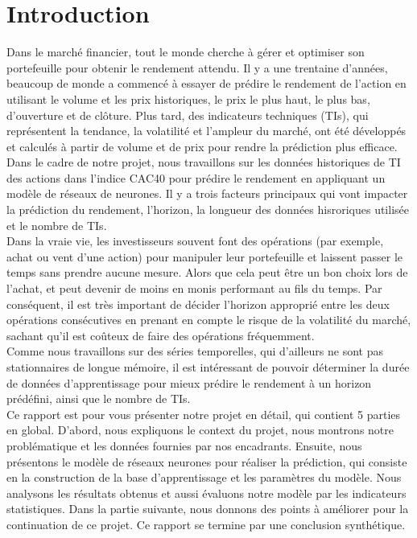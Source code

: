 
\section{Introduction}

Dans le marché financier, tout le monde cherche à gérer et optimiser son portefeuille pour obtenir le rendement attendu. Il y a une trentaine d'années, beaucoup de monde a commencé à essayer de prédire le rendement de l'action en utilisant le volume et les prix historiques, le prix le plus haut, le plus bas, d'ouverture et de clôture. Plus tard, des indicateurs techniques (TIs), qui représentent la tendance, la volatilité et l'ampleur du marché, ont été développés et calculés à partir de volume et de prix pour rendre la prédiction plus efficace.\\

Dans le cadre de notre projet, nous travaillons sur les données historiques de TI des actions dans l'indice CAC40 pour prédire le rendement en appliquant un modèle de réseaux de neurones. Il y a trois facteurs principaux qui vont impacter la prédiction du rendement, l'horizon, la longueur des données hisroriques utilisée et le nombre de TIs.\\

Dans la vraie vie, les investisseurs souvent font des opérations (par exemple, achat ou vent d'une action) pour manipuler leur portefeuille et laissent passer le temps sans prendre aucune mesure. Alors que cela peut être un bon choix lors de l'achat, et peut devenir de moins en monis performant au fils du temps. Par conséquent, il est très important de décider l'horizon approprié entre les deux opérations consécutives en prenant en compte le risque de la volatilité du marché, sachant qu'il est coûteux de faire des opérations fréquemment.\\

Comme nous travaillons sur des séries temporelles, qui d'ailleurs ne sont pas stationnaires de longue mémoire, il est intéressant de pouvoir déterminer la durée de données d'apprentissage pour mieux prédire le rendement à un horizon prédéfini, ainsi que le nombre de TIs.\\

Ce rapport est pour vous présenter notre projet en détail, qui contient 5 parties en global. D’abord, nous expliquons le context du projet, nous montrons notre problématique et les données fournies par nos encadrants. Ensuite, nous présentons le modèle de réseaux neurones pour réaliser la prédiction, qui consiste en la construction de la base d’apprentissage et les paramètres du modèle. Nous analysons les résultats obtenus et aussi évaluons notre modèle par les indicateurs statistiques. Dans la partie suivante, nous donnons des points à améliorer pour la continuation de ce projet. Ce rapport se termine par une conclusion synthétique. 


